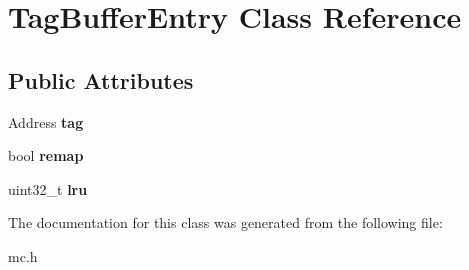 \hypertarget{classTagBufferEntry}{\section{Tag\-Buffer\-Entry Class Reference}
\label{classTagBufferEntry}
}
\subsection*{Public Attributes}
\begin{DoxyCompactItemize}
\item 
\hypertarget{classTagBufferEntry_a6efe7fda2a966818e03beb9c9cd0b881}{Address {\bfseries tag}}\label{classTagBufferEntry_a6efe7fda2a966818e03beb9c9cd0b881}

\item 
\hypertarget{classTagBufferEntry_a674aae26121cfde9b023775793f3a59f}{bool {\bfseries remap}}\label{classTagBufferEntry_a674aae26121cfde9b023775793f3a59f}

\item 
\hypertarget{classTagBufferEntry_a9db02b29551f7145417005f7f59a73aa}{uint32\-\_\-t {\bfseries lru}}\label{classTagBufferEntry_a9db02b29551f7145417005f7f59a73aa}

\end{DoxyCompactItemize}


The documentation for this class was generated from the following file\-:\begin{DoxyCompactItemize}
\item 
mc.\-h\end{DoxyCompactItemize}
